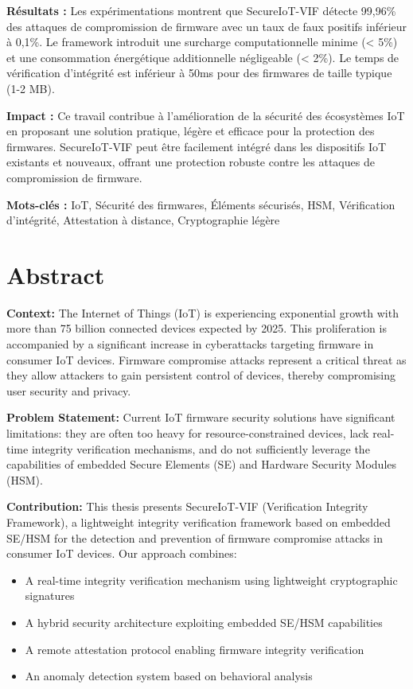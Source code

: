 \textbf{Résultats :} Les expérimentations montrent que SecureIoT-VIF détecte 99,96\% des attaques de compromission de firmware avec un taux de faux positifs inférieur à 0,1\%. Le framework introduit une surcharge computationnelle minime (< 5\%) et une consommation énergétique additionnelle négligeable (< 2\%). Le temps de vérification d'intégrité est inférieur à 50ms pour des firmwares de taille typique (1-2 MB).

\textbf{Impact :} Ce travail contribue à l'amélioration de la sécurité des écosystèmes IoT en proposant une solution pratique, légère et efficace pour la protection des firmwares. SecureIoT-VIF peut être facilement intégré dans les dispositifs IoT existants et nouveaux, offrant une protection robuste contre les attaques de compromission de firmware.

\textbf{Mots-clés :} IoT, Sécurité des firmwares, Éléments sécurisés, HSM, Vérification d'intégrité, Attestation à distance, Cryptographie légère

\vfill

\chapter*{Abstract}

\textbf{Context:} The Internet of Things (IoT) is experiencing exponential growth with more than 75 billion connected devices expected by 2025. This proliferation is accompanied by a significant increase in cyberattacks targeting firmware in consumer IoT devices. Firmware compromise attacks represent a critical threat as they allow attackers to gain persistent control of devices, thereby compromising user security and privacy.

\textbf{Problem Statement:} Current IoT firmware security solutions have significant limitations: they are often too heavy for resource-constrained devices, lack real-time integrity verification mechanisms, and do not sufficiently leverage the capabilities of embedded Secure Elements (SE) and Hardware Security Modules (HSM).

\textbf{Contribution:} This thesis presents SecureIoT-VIF (Verification Integrity Framework), a lightweight integrity verification framework based on embedded SE/HSM for the detection and prevention of firmware compromise attacks in consumer IoT devices. Our approach combines:

\begin{itemize}
    \item A real-time integrity verification mechanism using lightweight cryptographic signatures
    \item A hybrid security architecture exploiting embedded SE/HSM capabilities
    \item A remote attestation protocol enabling firmware integrity verification
    \item An anomaly detection system based on behavioral analysis
\end{itemize}

